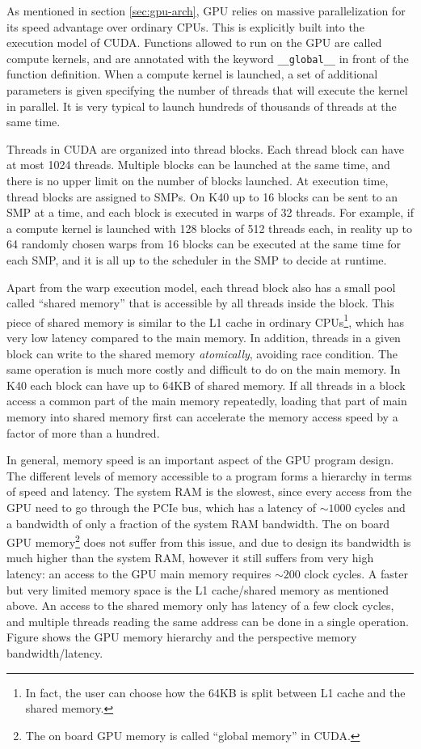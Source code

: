 As mentioned in section \ref{sec:gpu-arch}, GPU relies on massive
parallelization for its speed advantage over ordinary CPUs. This is explicitly
built into the execution model of CUDA. Functions allowed to run on the GPU are
called compute kernels, and are annotated with the keyword \verb!__global__! in
front of the function definition. When a compute kernel is launched, a set of
additional parameters is given specifying the number of threads that will
execute the kernel in parallel. It is very typical to launch hundreds of
thousands of threads at the same time.

Threads in CUDA are organized into thread blocks. Each thread block can have at
most 1024 threads. Multiple blocks can be launched at the same time, and there
is no upper limit on the number of blocks launched. At execution time, thread
blocks are assigned to SMPs. On K40 up to 16 blocks can be sent to an SMP at a
time, and each block is executed in warps of 32 threads. For example, if a
compute kernel is launched with 128 blocks of 512 threads each, in reality up to
64 randomly chosen warps from 16 blocks can be executed at the same time for
each SMP, and it is all up to the scheduler in the SMP to decide at runtime.

Apart from the warp execution model, each thread block also has a small pool
called ``shared memory'' that is accessible by all threads inside the block.
This piece of shared memory is similar to the L1 cache in ordinary
CPUs\footnote{In fact, the user can choose how the 64KB is split between L1
  cache and the shared memory.}, which has very low latency compared to the main
memory. In addition, threads in a given block can write to the shared memory
{\it atomically}, avoiding race condition. The same operation is much more
costly and difficult to do on the main memory. In K40 each block can have up to
64KB of shared memory. If all threads in a block access a common part of the
main memory repeatedly, loading that part of main memory into shared memory
first can accelerate the memory access speed by a factor of more than a hundred.

In general, memory speed is an important aspect of the GPU program design. The
different levels of memory accessible to a program forms a hierarchy in terms of
speed and latency. The system RAM is the slowest, since every access from the
GPU need to go through the PCIe bus, which has a latency of $\sim 1000$ cycles
and a bandwidth of only a fraction of the system RAM bandwidth. The on board GPU
memory\footnote{The on board GPU memory is called ``global memory'' in CUDA.}
does not suffer from this issue, and due to design its bandwidth is much higher
than the system RAM, however it still suffers from very high latency: an access
to the GPU main memory requires $\sim 200$ clock cycles. A faster but very
limited memory space is the L1 cache/shared memory as mentioned above. An access
to the shared memory only has latency of a few clock cycles, and multiple
threads reading the same address can be done in a single operation.
Figure %
shows the GPU memory hierarchy and the perspective memory bandwidth/latency.

